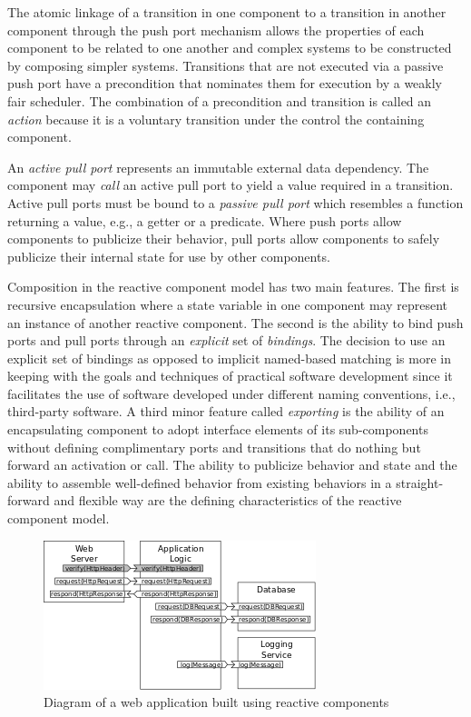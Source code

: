 The atomic linkage of a transition in one component to a transition in another component through the push port mechanism allows the properties of each component to be related to one another and complex systems to be constructed by composing simpler systems.
Transitions that are not executed via a passive push port have a precondition that nominates them for execution by a weakly fair scheduler.
The combination of a precondition and transition is called an \emph{action} because it is a voluntary transition under the control the containing component.

An \emph{active pull port} represents an immutable external data dependency.
The component may \emph{call} an active pull port to yield a value required in a transition.
Active pull ports must be bound to a \emph{passive pull port} which resembles a function returning a value, e.g., a getter or a predicate.
Where push ports allow components to publicize their behavior, pull ports allow components to safely publicize their internal state for use by other components.

Composition in the reactive component model has two main features.
The first is recursive encapsulation where a state variable in one component may represent an instance of another reactive component.
The second is the ability to bind push ports and pull ports through an \emph{explicit} set of \emph{bindings}.
The decision to use an explicit set of bindings as opposed to implicit named-based matching is more in keeping with the goals and techniques of practical software development since it facilitates the use of software developed under different naming conventions, i.e., third-party software.
A third minor feature called \emph{exporting} is the ability of an encapsulating component to adopt interface elements of its sub-components without defining complimentary ports and transitions that do nothing but forward an activation or call.
The ability to publicize behavior and state and the ability to assemble well-defined behavior from existing behaviors in a straight-forward and flexible way are the defining characteristics of the reactive component model.

\begin{figure}
\centering
\includegraphics{web_server.png}
\caption{Diagram of a web application built using reactive components\label{web_server}}
\end{figure}

